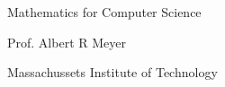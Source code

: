 \begin{center}
\begin{minipage}{4.5in}
\begin{center}
\rule{0in}{2in}
{\huge Mathematics for Computer Science}


\vspace{0.5in}

\Stamp

\vspace{1in}
{\LARGE Prof. Albert R Meyer}

{\large Massachussets Institute of Technology}

\end{center}

\end{minipage}
\end{center}
\coursecopyright
